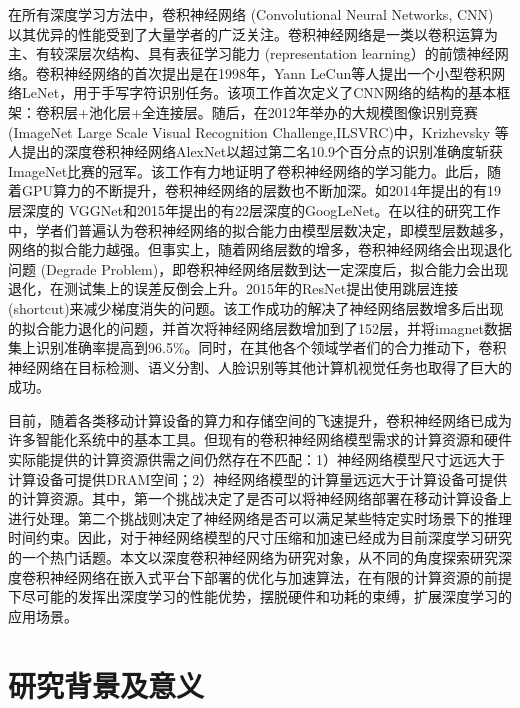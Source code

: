 在所有深度学习方法中，卷积神经网络 (Convolutional Neural Networks, CNN) 以其优异的性能受到了大量学者的广泛关注。卷积神经网络是一类以卷积运算为主、有较深层次结构、具有表征学习能力 (representation learning）的前馈神经网络。卷积神经网络的首次提出是在1998年，Yann LeCun等人提出一个小型卷积网络LeNet，用于手写字符识别任务\cite{lecun1998gradient}。该项工作首次定义了CNN网络的结构的基本框架：卷积层+池化层+全连接层。随后，在2012年举办的大规模图像识别竞赛 (ImageNet Large Scale Visual Recognition Challenge,ILSVRC)中，Krizhevsky 等人提出的深度卷积神经网络AlexNet\cite{krizhevsky2012imagenet}以超过第二名10.9个百分点的识别准确度斩获ImageNet比赛的冠军。该工作有力地证明了卷积神经网络的学习能力。此后，随着GPU算力的不断提升，卷积神经网络的层数也不断加深。如2014年提出的有19层深度的 VGGNet\cite{simonyan2014very}和2015年提出的有22层深度的GoogLeNet\cite{szegedy2015going}。在以往的研究工作中，学者们普遍认为卷积神经网络的拟合能力由模型层数决定，即模型层数越多，网络的拟合能力越强。但事实上，随着网络层数的增多，卷积神经网络会出现退化问题 (Degrade Problem)，即卷积神经网络层数到达一定深度后，拟合能力会出现退化，在测试集上的误差反倒会上升。2015年的ResNet\cite{he2016deep}提出使用跳层连接(shortcut)来减少梯度消失的问题。该工作成功的解决了神经网络层数增多后出现的拟合能力退化的问题，并首次将神经网络层数增加到了152层，并将imagnet数据集上识别准确率提高到96.5\%。同时，在其他各个领域学者们的合力推动下，卷积神经网络在目标检测、语义分割、人脸识别等其他计算机视觉任务也取得了巨大的成功。

目前，随着各类移动计算设备的算力和存储空间的飞速提升，卷积神经网络已成为许多智能化系统中的基本工具。但现有的卷积神经网络模型需求的计算资源和硬件实际能提供的计算资源供需之间仍然存在不匹配：1）神经网络模型尺寸远远大于计算设备可提供DRAM空间；2）神经网络模型的计算量远远大于计算设备可提供的计算资源。其中，第一个挑战决定了是否可以将神经网络部署在移动计算设备上进行处理。第二个挑战则决定了神经网络是否可以满足某些特定实时场景下的推理时间约束。因此，对于神经网络模型的尺寸压缩和加速已经成为目前深度学习研究的一个热门话题。本文以深度卷积神经网络为研究对象，从不同的角度探索研究深度卷积神经网络在嵌入式平台下部署的优化与加速算法，在有限的计算资源的前提下尽可能的发挥出深度学习的性能优势，摆脱硬件和功耗的束缚，扩展深度学习的应用场景。

\section{研究背景及意义}

